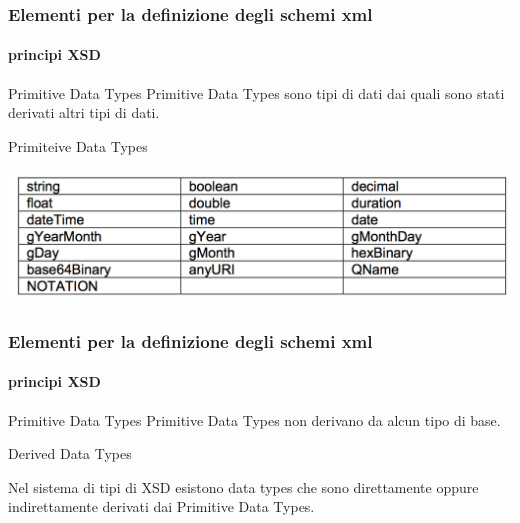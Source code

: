 \begin{frame}
	\frametitle{Elementi per la definizione degli schemi xml}
	\framesubtitle{principi XSD}
	\addtocounter{nframe}{1}

	\begin{block}{Primitive Data Types}
		Primitive Data Types sono tipi di dati dai quali sono stati derivati altri tipi di dati.
	\end{block}


	\begin{block}{Primiteive Data Types}

		\includegraphics[width=.95\textwidth]{imgs/TabellaDataTypeXSD.png}

	\end{block}

\end{frame}

\begin{frame}
	\frametitle{Elementi per la definizione degli schemi xml}
	\framesubtitle{principi XSD}
	\addtocounter{nframe}{1}

	\begin{block}{Primitive Data Types}
		Primitive Data Types non derivano da alcun tipo di base.
	\end{block}

	\begin{block}{Derived Data Types}

		Nel sistema di tipi di XSD esistono data types che sono direttamente oppure indirettamente derivati dai Primitive Data Types.

	\end{block}

\end{frame}


